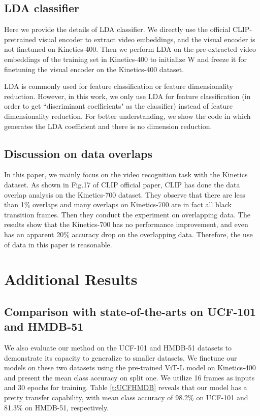 \documentclass[letterpaper]{article} \usepackage{aaai23}  \usepackage{times}  \usepackage{helvet}  \usepackage{courier}  \usepackage[hyphens]{url}  \usepackage{graphicx} \urlstyle{rm} \def\UrlFont{\rm}  \usepackage{natbib}  \usepackage{caption} \frenchspacing  \setlength{\pdfpagewidth}{8.5in}  \setlength{\pdfpageheight}{11in}  \usepackage{algorithm}
\begin{document}
\subsection{LDA classifier}\label{supp:lda}
Here we provide the details of LDA classifier.
We directly use the official CLIP-pretrained visual encoder to extract video embeddings, and the visual encoder is not finetuned on Kinetics-400. Then we perform LDA on the pre-extracted video embeddings of the training set in Kinetics-400 to initialize W and freeze it for finetuning the visual encoder on the Kinetics-400 dataset.

LDA is commonly used for feature classification or feature dimensionality reduction. However, in this work, we only use LDA for feature classification (in order to get ``discriminant coefficients" as the classifier) instead of feature dimensionality reduction.
For better understanding, we show the code in  which generates the LDA coefficient and there is no dimension reduction.

\subsection{Discussion on data overlaps}\label{sec:overlaps}
In this paper, we mainly focus on the video recognition task with the Kinetics dataset. As shown in Fig.17 of CLIP official paper, CLIP has done the data overlap analysis on the Kinetics-700 dataset. They observe that there are less than 1\% overlaps and many overlaps on Kinetics-700 are in fact all black transition frames. Then they conduct the experiment on overlapping data. The results show that the Kinetics-700 has no performance improvement, and even has an apparent 20\% accuracy drop on the overlapping data. Therefore, the use of data in this paper is reasonable.


\section{Additional Results}\label{sec:results}
\subsection{Comparison with state-of-the-arts on UCF-101 and HMDB-51}\label{sec:small_sota}
We also evaluate our method on the UCF-101 and HMDB-51 datasets to demonstrate its capacity to generalize to smaller datasets.
We finetune our models on these two datasets using the pre-trained ViT-L model on Kinetics-400 and present the mean class accuracy on split one. We utilize 16 frames as inputs and 30 epochs for training.
Table \ref{t:UCFHMDB} reveals that our model has a pretty transfer capability, with mean class accuracy of 98.2\% on UCF-101 and 81.3\% on HMDB-51, respectively.
\end{document}
